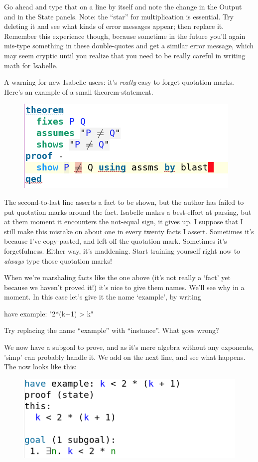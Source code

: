 \task Go ahead and type that on a line by itself and note the change in the Output and in the State panels. Note: the ``star'' for multiplication is essential. Try deleting it and see what kinds of error messages appear; then replace it. Remember this experience though, because sometime in the future you'll again mis-type something in these double-quotes and get a similar error message, which may seem cryptic until you realize that you need to be really careful in writing math for Isabelle.
\etask

A warning for new Isabelle users: it's \textit{really} easy to forget quotation marks. Here's an example of a small theorem-statement. 
\begin{figure}[h]
    \includegraphics[width=0.5\linewidth]{C01/Images/missing-quotes.png}
\end{figure}
The second-to-last line asserts a fact to be shown, but the author has failed to put quotation marks around the fact. Isabelle makes a best-effort at parsing, but at them moment it encounters the not-equal sign, it gives up. I suppose that I still make this mistake on about one in every twenty facts I assert. Sometimes it's because I've copy-pasted, and left off the quotation mark. Sometimes it's forgetfulness. Either way, it's maddening. Start training yourself right now to \textit{always} type those quotation marks!

When we're marshaling facts like the one above (it's not really a `fact' yet because we haven't proved it!) it's nice to give them names. We'll see why in a moment. In this case let's give it the name `example', by writing
\begin{IS}
have example: "2*(k+1) > k"    
\end{IS}

\task 
Try replacing the name ``example'' with ``instance''. What goes wrong? 
\etask

We now have a subgoal to prove, and as it's mere algebra without any exponents, 'simp' can probably handle it.  We add  on the next line, and see what happens. The  now looks like this:

\begin{figure}[h]
    \includegraphics[width=0.5\linewidth]{C01/Images/proof-state.png}
\end{figure}

